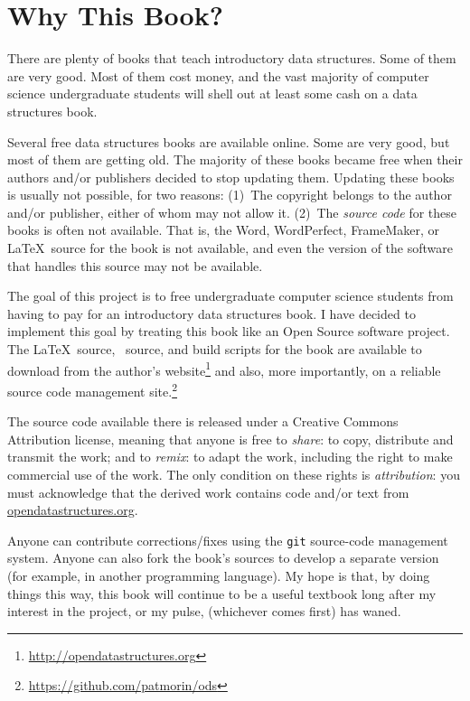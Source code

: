 \chapter*{Why This Book?}

There are plenty of books that teach introductory data structures.
Some of them are very good.  Most of them cost money, and the vast
majority of computer science undergraduate students will shell out at
least some cash on a data structures book.

Several free data structures books are available online.  Some are very
good, but most of them are getting old.  The majority of these books
became free when their authors and/or publishers decided to stop updating
them.  Updating these books is usually not possible, for two reasons:
(1)~The copyright belongs to the author and/or publisher, either of whom
may not allow it.  (2)~The \emph{source code} for these books is often
not available.  That is, the Word, WordPerfect, FrameMaker, or \LaTeX\
source for the book is not available, and even the version of the software
that handles this source may not be available.

The goal of this project is to free undergraduate computer science
students from having to pay for an introductory data structures book.
I have decided to implement this goal by treating this book like an
Open Source
software project.  The \LaTeX\ source, \lang\ source, and
build scripts for the book are available to download from the
author's website\footnote{\url{http://opendatastructures.org}}
and also, more importantly, on a reliable source code management
site.\footnote{\url{https://github.com/patmorin/ods}}

The source code available there is released under a Creative Commons
Attribution license, meaning that anyone is free to \emph{share}:
\index{share}
to copy, distribute and
transmit the work; and to \emph{remix}:
to adapt the work, including the
right to make commercial use of the work.  The only condition on these
rights is \emph{attribution}: you must acknowledge that the derived work
contains code and/or text from \url{opendatastructures.org}.

Anyone can contribute corrections/fixes using the \texttt{git}
source-code management system.  Anyone can also fork the book's sources to
develop a separate version (for example, in another programming language).
My hope is that, by doing things this way, this book will continue to
be a useful textbook long after my interest in the project, or my pulse,
(whichever comes first) has waned.


